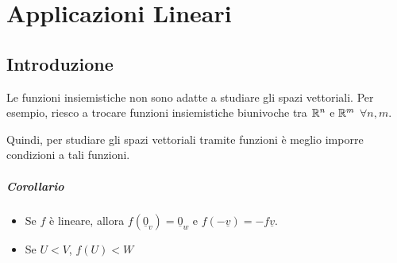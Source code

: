 \chapter{Applicazioni Lineari}

\section{Introduzione}
Le funzioni insiemistiche non sono adatte a studiare gli spazi vettoriali.
Per esempio, riesco a trocare funzioni insiemistiche biunivoche tra $\mathbb{R}^n$ e $\mathbb{R}^m$ $\forall n,m$.

Quindi, per studiare gli spazi vettoriali tramite funzioni è meglio imporre condizioni a tali funzioni.

\paragraph{Corollario}
\begin{itemize}
    \item Se $f$ è lineare, allora $f(\underline{0}_v) = \underline{0}_w$ e $f(-\underline{v}) = -f\underline{v}$.
    \item Se $U<V$, $f(U) < W$
\end{itemize}

\osservazione{}